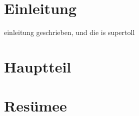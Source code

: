 \documentclass[11pt,a4paper]{article}
\begin{document}
\section{Einleitung}

einleitung geschrieben, und die is supertoll

\section{Hauptteil}

\section{Resümee}
\end{document}
